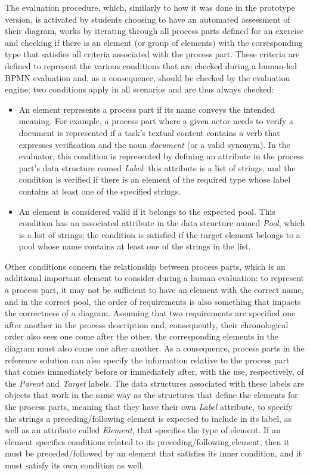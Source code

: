 The evaluation procedure, which, similarly to how it was done in the prototype version, is activated by students choosing to have an automated assessment of their diagram, works by iterating through all process parts defined for an exercise and checking if there is an element (or group of elements) with the corresponding type that satisfies all criteria associated with the process part. These criteria are defined to represent the various conditions that are checked during a human-led BPMN evaluation and, as a consequence, should be checked by the evaluation engine; two conditions apply in all scenarios and are thus always checked:

\begin{itemize}
    \item An element represents a process part if its name conveys the intended meaning. For example, a process part where a given actor needs to verify a document is represented if a task's textual content contains a verb that expresses verification and the noun \textit{document} (or a valid synonym). In the evaluator, this condition is represented by defining an attribute in the process part's data structure named \textit{Label}: this attribute is a list of strings, and the condition is verified if there is an element of the required type whose label contains at least one of the specified strings.
    \item An element is considered valid if it belongs to the expected pool. This condition has an associated attribute in the data structure named \textit{Pool}, which is a list of strings; the condition is satisfied if the target element belongs to a pool whose name contains at least one of the strings in the list.
\end{itemize}

Other conditions concern the relationship between process parts, which is an additional important element to consider during a human evaluation: to represent a process part, it may not be sufficient to have an element with the correct name, and in the correct pool, the order of requirements is also something that impacts the correctness of a diagram. Assuming that two requirements are specified one after another in the process description and, consequently, their chronological order also sees one come after the other, the corresponding elements in the diagram must also come one after another. As a consequence, process parts in the reference solution can also specify the information relative to the process part that comes immediately before or immediately after, with the use, respectively, of the \textit{Parent} and \textit{Target} labels. The data structures associated with these labels are objects that work in the same way as the structures that define the elements for the process parts, meaning that they have their own \textit{Label} attribute, to specify the strings a preceding/following element is expected to include in its label, as well as an attribute called \textit{Element}, that specifies the type of element. If an element specifies conditions related to its preceding/following element, then it must be preceded/followed by an element that satisfies its inner condition, and it must satisfy its own condition as well.

